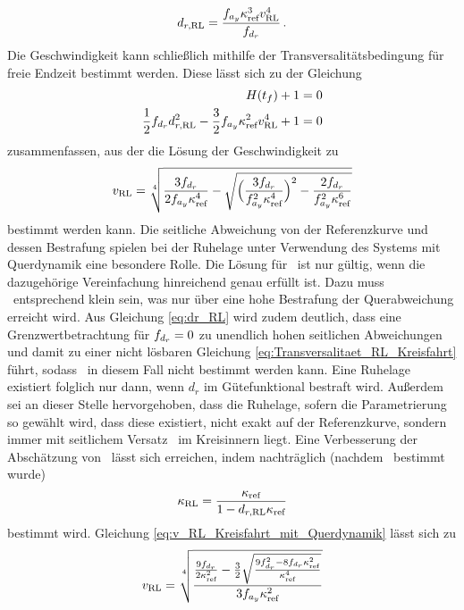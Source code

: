 \begin{equation}
d_{r,\textrm{RL}} = \frac{f_{a_y}\kappa_{\textrm{ref}}^3v_{\textrm{RL}}^4}{f_{d_r}}\,.
\end{equation}
Die Geschwindigkeit kann schließlich mithilfe der Transversalitätsbedingung für freie Endzeit bestimmt werden. Diese lässt sich zu der Gleichung
\begin{align}
H(t_f) + 1 &= 0\\
\frac{1}{2}f_{d_r}d_{r,\textrm{RL}}^2 - \frac{3}{2}f_{a_y}\kappa_{\textrm{ref}}^2v_{\textrm{RL}}^4 + 1 &= 0 \label{eq:Transversalitaet_RL_Kreisfahrt}
\end{align}
zusammenfassen, aus der die Lösung der Geschwindigkeit zu 
\begin{equation}
v_{\textrm{RL}} = \sqrt[4]{\frac{3f_{d_r}}{2f_{a_y}\kappa_{\textrm{ref}}^4}-\sqrt{\Big(\frac{3f_{d_r}}{f_{a_y}^2\kappa_{\textrm{ref}}^4}\Big)^2 - \frac{2f_{d_r}}{f_{a_y}^2\kappa_{\textrm{ref}}^6}}} \label{eq:v_RL_Kreisfahrt_mit_Querdynamik}
\end{equation}
bestimmt werden kann. Die seitliche Abweichung von der Referenzkurve und dessen Bestrafung spielen bei der Ruhelage unter Verwendung des Systems mit Querdynamik eine besondere Rolle. Die Lösung für \kappaRL~ist nur gültig, wenn die dazugehörige Vereinfachung hinreichend genau erfüllt ist. Dazu muss \drRL~entsprechend klein sein, was nur über eine hohe Bestrafung der Querabweichung erreicht wird. Aus Gleichung \eqref{eq:dr_RL} wird zudem deutlich, dass eine Grenzwertbetrachtung für $f_{d_r}=0$ zu unendlich hohen seitlichen Abweichungen und damit zu einer nicht lösbaren Gleichung \eqref{eq:Transversalitaet_RL_Kreisfahrt} führt, sodass \vRL~in diesem Fall nicht bestimmt werden kann. Eine Ruhelage existiert folglich nur dann, wenn $d_r$ im Gütefunktional bestraft wird. Außerdem sei an dieser Stelle hervorgehoben, dass die Ruhelage, sofern die Parametrierung so gewählt wird, dass diese existiert, nicht exakt auf der Referenzkurve, sondern immer mit seitlichem Versatz \drRL~im Kreisinnern liegt. Eine Verbesserung der Abschätzung von \kappaRL~lässt sich erreichen, indem nachträglich (nachdem \drRL~bestimmt wurde)
\begin{equation}
\kappa_{\textrm{RL}} = \frac{\kappa_{\textrm{ref}}}{1-d_{r,\textrm{RL}}\kappa_{\textrm{ref}}} \label{eq:kappaRL_exakt}
\end{equation}
bestimmt wird. Gleichung \eqref{eq:v_RL_Kreisfahrt_mit_Querdynamik} lässt sich zu 
\begin{equation}
v_{\textrm{RL}} = \sqrt[4]{\frac{\frac{9f_{d_r}}{2\kappa_{\textrm{ref}}^2}-\frac{3}{2}\sqrt{\frac{9f_{d_r}^2-8f_{d_r}\kappa_{\textrm{ref}}^2}{\kappa_{\textrm{ref}}^4}}}{3f_{a_y}\kappa_{\textrm{ref}}^2}} \label{eq:v_RL_Kreisfahrt_mit_Querdynamik_umform}
\end{equation}
